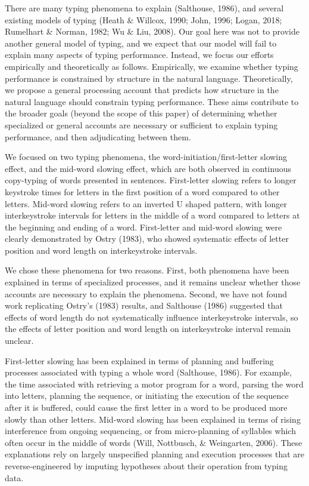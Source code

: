 \documentclass[floatsintext,man]{apa6}
\theoremstyle{definition}
\theoremstyle{definition}
\theoremstyle{definition}
\theoremstyle{remark}
\begin{document}
There are many typing phenomena to explain (Salthouse, 1986), and
several existing models of typing (Heath \& Willcox, 1990; John, 1996;
Logan, 2018; Rumelhart \& Norman, 1982; Wu \& Liu, 2008). Our goal here
was not to provide another general model of typing, and we expect that
our model will fail to explain many aspects of typing performance.
Instead, we focus our efforts empirically and theoretically as follows.
Empirically, we examine whether typing performance is constrained by
structure in the natural language. Theoretically, we propose a general
processing account that predicts how structure in the natural language
should constrain typing performance. These aims contribute to the
broader goals (beyond the scope of this paper) of determining whether
specialized or general accounts are necessary or sufficient to explain
typing performance, and then adjudicating between them.

We focused on two typing phenomena, the word-initiation/first-letter
slowing effect, and the mid-word slowing effect, which are both observed
in continuous copy-typing of words presented in sentences. First-letter
slowing refers to longer keystroke times for letters in the first
position of a word compared to other letters. Mid-word slowing refers to
an inverted U shaped pattern, with longer interkeystroke intervals for
letters in the middle of a word compared to letters at the beginning and
ending of a word. First-letter and mid-word slowing were clearly
demonstrated by Ostry (1983), who showed systematic effects of letter
position and word length on interkeystroke intervals.

We chose these phenomena for two reasons. First, both phenomena have
been explained in terms of specialized processes, and it remains unclear
whether those accounts are necessary to explain the phenomena. Second,
we have not found work replicating Ostry's (1983) results, and Salthouse
(1986) suggested that effects of word length do not systematically
influence interkeystroke intervals, so the effects of letter position
and word length on interkeystroke interval remain unclear.

First-letter slowing has been explained in terms of planning and
buffering processes associated with typing a whole word (Salthouse,
1986). For example, the time associated with retrieving a motor program
for a word, parsing the word into letters, planning the sequence, or
initiating the execution of the sequence after it is buffered, could
cause the first letter in a word to be produced more slowly than other
letters. Mid-word slowing has been explained in terms of rising
interference from ongoing sequencing, or from micro-planning of
syllables which often occur in the middle of words (Will, Nottbusch, \&
Weingarten, 2006). These explanations rely on largely unspecified
planning and execution processes that are reverse-engineered by imputing
hypotheses about their operation from typing data.
\end{document}
